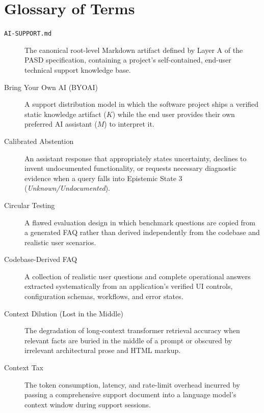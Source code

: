 \documentclass[12pt, a4paper]{article}
\begin{document}
\newpage
\section{Glossary of Terms}
\label{app:glossary}

\begin{description}
    \item[\texttt{AI-SUPPORT.md}] \label{def:ai_support_md}
    The canonical root-level Markdown artifact defined by Layer A of the PASD specification, containing a project's self-contained, end-user technical support knowledge base.

    \item[Bring Your Own AI (BYOAI)] \label{def:byoai}
    A support distribution model in which the software project ships a verified static knowledge artifact ($K$) while the end user provides their own preferred AI assistant ($M$) to interpret it.

    \item[Calibrated Abstention] \label{def:abstention}
    An assistant response that appropriately states uncertainty, declines to invent undocumented functionality, or requests necessary diagnostic evidence when a query falls into Epistemic State 3 (\textit{Unknown/Undocumented}).

    \item[Circular Testing] \label{def:circular}
    A flawed evaluation design in which benchmark questions are copied from a generated FAQ rather than derived independently from the codebase and realistic user scenarios.

    \item[Codebase-Derived FAQ] \label{def:faq}
    A collection of realistic user questions and complete operational answers extracted systematically from an application's verified UI controls, configuration schemas, workflows, and error states.

    \item[Context Dilution (Lost in the Middle)] \label{def:dilution}
    The degradation of long-context transformer retrieval accuracy when relevant facts are buried in the middle of a prompt or obscured by irrelevant architectural prose and HTML markup.

    \item[Context Tax] \label{def:context_tax}
    The token consumption, latency, and rate-limit overhead incurred by passing a comprehensive support document into a language model's context window during support sessions.


\end{description}
\end{document}
